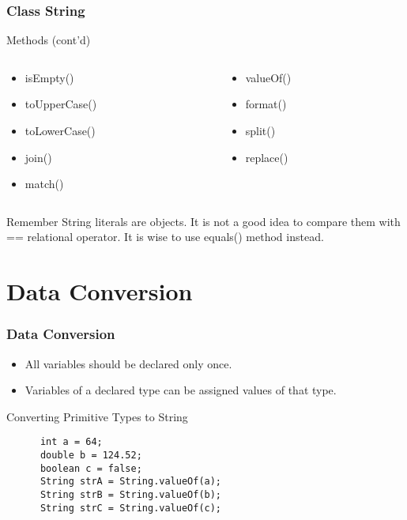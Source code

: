 \documentclass[10pt, compress]{beamer}
\begin{document}
\begin{frame}[fragile]
  \frametitle{Class String}
  \begin{block}{Methods (cont'd)}
    \begin{columns}
      \begin{column}{0.5\textwidth}
        \begin{itemize}
          \item[] isEmpty()
          \item[] toUpperCase()
          \item[] toLowerCase()
          \item[] join()
          \item[] match()
        \end{itemize}
      \end{column}
      \begin{column}{0.5\textwidth}
        \begin{itemize}
          \item[] valueOf()
          \item[] format()
          \item[] split()
          \item[] replace()
        \end{itemize}
      \end{column}
    \end{columns}
  \end{block}
  \begin{block}{Remember}
    String literals are objects. It is not a good idea to compare them with ={}= relational operator. It is wise to use equals() method instead.
  \end{block}
\end{frame}

\section{Data Conversion}

\begin{frame}[fragile]
  \frametitle{Data Conversion}
  \begin{itemize}
    \item[] All variables should be declared only once.
    \item[] Variables of a declared type can be assigned values of that type.
  \end{itemize}
  \begin{block}{Converting Primitive Types to String}
    \begin{verbatim}
      int a = 64;
      double b = 124.52;
      boolean c = false;
      String strA = String.valueOf(a);
      String strB = String.valueOf(b);
      String strC = String.valueOf(c);
    \end{verbatim}
  \end{block}
\end{frame}
\end{document}
